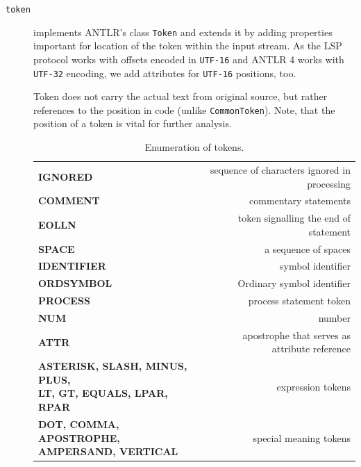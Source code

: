 \begin{description}
	
		\item[\texttt{token}] implements ANTLR's class \texttt{Token} and extends it by adding properties important for location of the token within the input stream. As the LSP protocol works with offsets encoded in \texttt{UTF-16} and ANTLR 4 works with \texttt{UTF-32} encoding, we add attributes for \texttt{UTF-16} positions, too.
		
		Token does not carry the actual text from original source, but rather references to the position in code (unlike \texttt{CommonToken}). Note, that the position of a token is vital for further analysis.
		
		\begin{table}
			\centering
			\begin{tabular}{lr}
				\toprule
				\textbf{IGNORED}                                                                     &  sequence of characters ignored in processing \\
				\textbf{COMMENT}                                                                     &                         commentary statements \\
				\textbf{EOLLN}                                                                       &         token signalling the end of statement \\
				\textbf{SPACE}                                                                       &                          a sequence of spaces \\
				\textbf{IDENTIFIER}                                                                  &                             symbol identifier \\
				\textbf{ORDSYMBOL}                                                                   &                    Ordinary symbol identifier \\
				\textbf{PROCESS}                                                                     &                       process statement token \\
				\textbf{NUM}                                                                         &                                        number \\
				\textbf{ATTR}                                                                        & apostrophe that serves as attribute reference \\
				\thead{\textbf{ASTERISK, SLASH, MINUS, PLUS,}\\ \textbf{LT, GT, EQUALS, LPAR, RPAR}} &                             expression tokens \\
				\thead{\textbf{DOT, COMMA, APOSTROPHE,}\\ \textbf{AMPERSAND, VERTICAL}}              &                        special meaning tokens \\ \bottomrule
			\end{tabular}
			\caption{Enumeration of tokens.}
			\label{tab06:tokens}
		\end{table}
		

\end{description}
